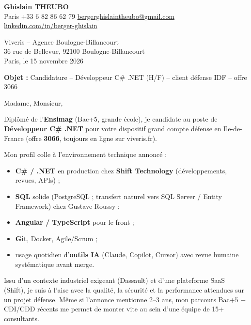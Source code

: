 \documentclass[11pt,a4paper]{article}
\begin{document}

\noindent\textbf{Ghislain THEUBO}\\
Paris \quad +33 6 82 86 62 79 \quad \href{mailto:bergerghislaintheubo@gmail.com}{bergerghislaintheubo@gmail.com}\\
\href{https://www.linkedin.com/in/berger-ghislain}{linkedin.com/in/berger-ghislain}

\vspace{0.5em}
\begin{flushright}
Viveris -- Agence Boulogne-Billancourt\\
36 rue de Bellevue, 92100 Boulogne-Billancourt\\
Paris, le 15 novembre 2026
\end{flushright}

\vspace{0.35em}
\noindent\textbf{Objet :} Candidature -- D\'eveloppeur C\# .NET (H/F) -- client d\'efense IDF -- offre 3066

\vspace{0.7em}
\noindent Madame, Monsieur,

\vspace{0.4em}
\noindent Dipl\^om\'e de l'\textbf{Ensimag} (Bac+5, grande \'ecole), je candidate au poste de \textbf{D\'eveloppeur C\# .NET} pour votre dispositif grand compte d\'efense en Ile-de-France (offre \textbf{3066}, toujours en ligne sur viveris.fr).

\vspace{0.35em}
\noindent Mon profil colle \`a l'environnement technique annonc\'e :
\begin{itemize}\itemsep0.12em
  \item \textbf{C\# / .NET} en production chez \textbf{Shift Technology} (d\'eveloppements, revues, APIs) ;
  \item \textbf{SQL} solide (PostgreSQL ; transfert naturel vers SQL Server / Entity Framework) chez Gustave Roussy ;
  \item \textbf{Angular / TypeScript} pour le front ;
  \item \textbf{Git}, Docker, Agile/Scrum ;
  \item usage quotidien d'\textbf{outils IA} (Claude, Copilot, Cursor) avec revue humaine syst\'ematique avant merge.
\end{itemize}

\noindent Issu d'un contexte industriel exigeant (Dassault) et d'une plateforme SaaS (Shift), je suis \`a l'aise avec la qualit\'e, la s\'ecurit\'e et la performance attendues sur un projet d\'efense. M\^eme si l'annonce mentionne 2--3 ans, mon parcours Bac+5 + CDI/CDD r\'ecents me permet de monter vite au sein d'une \'equipe de 15+ consultants.
\end{document}
